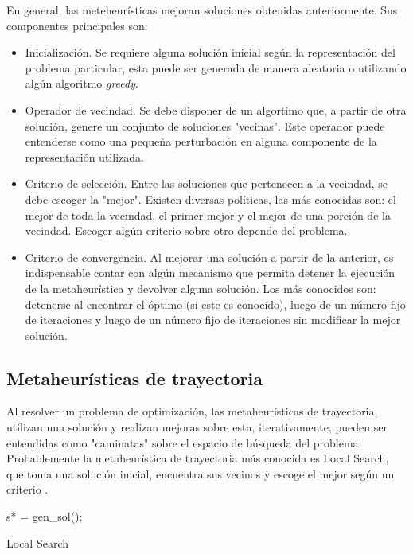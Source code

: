 \documentclass{ci5652}
\begin{document}
En general, las meteheurísticas mejoran soluciones obtenidas anteriormente. Sus
componentes principales son:

\begin{itemize}
  \item Inicialización. Se requiere alguna solución inicial según la 
  representación del problema particular, esta puede ser generada de manera
  aleatoria o utilizando algún algoritmo \textit{greedy}.
  \item Operador de vecindad. Se debe disponer de un algortimo que, a partir de
  otra solución, genere un conjunto de soluciones "vecinas". Este operador puede
  entenderse como una pequeña perturbación en alguna componente de la 
  representación utilizada.
  \item Criterio de selección. Entre las soluciones que pertenecen a la 
  vecindad, se debe escoger la "mejor". Existen diversas políticas, las más
  conocidas son: el mejor de toda la vecindad, el primer mejor y el mejor de una
  porción de la vecindad. Escoger algún criterio sobre otro depende del
  problema.
  \item Criterio de convergencia. Al mejorar una solución a partir de la 
  anterior, es indispensable contar con algún mecanismo que permita detener la
  ejecución de la metaheurística y devolver alguna solución. Los más conocidos
  son: detenerse al encontrar el óptimo (si este es conocido), luego de un 
  número fijo de iteraciones y luego de un número fijo de iteraciones sin 
  modificar la mejor solución.
  
\end{itemize}


\subsection{Metaheurísticas de trayectoria}

Al resolver un problema de optimización, las metaheurísticas de trayectoria,
utilizan una solución y realizan mejoras sobre esta, iterativamente; pueden ser
entendidas como "caminatas" sobre el espacio de búsqueda del problema. 
Probablemente la metaheurística de trayectoria más conocida es 
Local Search, que toma una solución inicial, encuentra sus vecinos y
escoge el mejor según un criterio \cite{Talbi_2009}. 

\begin{algorithm}
 \DontPrintSemicolon
 \vspace*{0.1cm}
  s* = gen\_sol();\;
 \vspace*{0.1cm}
 \caption{Local Search}
\end{algorithm}
\end{document}
